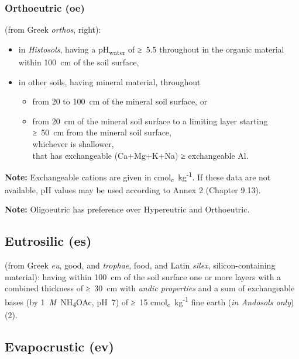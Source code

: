 \documentclass[
  letterpaper,
  DIV=11,
  numbers=noendperiod]{scrreprt}
\providecommand{\tightlist}{%
  \setlength{\itemsep}{0pt}\setlength{\parskip}{0pt}}\usepackage{longtable,booktabs,array}
\begin{document}
\hypertarget{orthoeutric-oe}{%
\subsubsection{Orthoeutric (oe)}\label{orthoeutric-oe}}

(from Greek \emph{orthos}, right):

\begin{itemize}
\tightlist
\item
  in \emph{Histosols}, having a pH\textsubscript{water} of ≥~5.5
  throughout in the organic material within 100~cm of the soil surface,
\item
  in other soils, having mineral material, throughout

  \begin{itemize}
  \tightlist
  \item
    from 20 to 100~cm of the mineral soil surface, or
  \item
    from 20~cm of the mineral soil surface to a limiting layer starting
    ≥~50~cm from the mineral soil surface,\\
    whichever is shallower,\\
    that has exchangeable (Ca+Mg+K+Na) ≥ exchangeable Al.
  \end{itemize}
\end{itemize}

\textbf{Note:} Exchangeable cations are given in
cmol\textsubscript{c}~kg\textsuperscript{-1}. If these data are not
available, pH values may be used according to Annex 2 (Chapter 9.13).

\textbf{Note:} Oligoeutric has preference over Hypereutric and
Orthoeutric.

\hypertarget{eutrosilic-es}{%
\subsection{Eutrosilic (es)}\label{eutrosilic-es}}

(from Greek \emph{eu}, good, and \emph{trophae}, food, and Latin
\emph{silex}, silicon-containing material): having within 100~cm of the
soil surface one or more layers with a combined thickness of ≥~30~cm
with \emph{andic properties} and a sum of exchangeable bases (by
1~\emph{M}~NH\textsubscript{4}OAc, pH~7) of ≥~15
cmol\textsubscript{c}~kg\textsuperscript{-1} fine earth (\emph{in
Andosols only}) (2).

\hypertarget{evapocrustic-ev}{%
\subsection{Evapocrustic (ev)}\label{evapocrustic-ev}}
\end{document}
